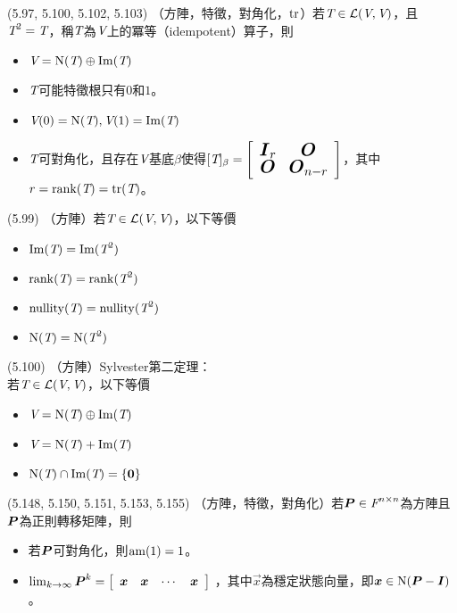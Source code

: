 \item \begin{theorem}{(5.97, 5.100, 5.102, 5.103)} （方陣，特徵，對角化，$\tr$）若$\T \in \L(\V, \V)$，且$\T^2 = \T$，稱$\T$為$\V$上的冪等（idempotent）算子，則
	\begin{itemize}
		\item $\V = \Ker(\T) \oplus \im(\T)$
		\item $\T$可能特徵根只有$0$和$1$。
		\item $\V(0) = \Ker(\T), \V(1) = \im(\T)$
		\item $\T$可對角化，且存在$\V$基底$\beta$使得$[\T]_{\beta} = 
		{\left[ 
		\begin{array}{cc}
			\Large{\mat{I}_r} & \Large{\mat{O}} \\
			\Large{\mat{O}} & \Large{\mat{O}_{n - r}}
		\end{array} 
		\right]}$，其中$r = \rnk(\T) = \tr(\T)$。
	\end{itemize}
\end{theorem}

\item \begin{theorem}{(5.99)} （方陣）若$\T \in \L(\V, \V)$，以下等價
	\begin{itemize}
		\item $\im(\T) = \im(\T^2)$
		\item $\rnk(\T) = \rnk(\T^2)$
		\item $\nul(\T) = \nul(\T^2)$
		\item $\Ker(\T) = \Ker(\T^2)$
	\end{itemize}
\end{theorem}

\item \begin{theorem}{(5.100)} （方陣）Sylvester第二定理： \\
	若$\T \in \L(\V, \V)$，以下等價
	\begin{itemize}
		\item $\V = \Ker(\T) \oplus \im(\T)$
		\item $\V = \Ker(\T) + \im(\T)$
		\item $\Ker(\T) \cap \im(\T) = \{\vec{0}\}$
	\end{itemize}
\end{theorem}

\item \begin{theorem}{(5.148, 5.150, 5.151, 5.153, 5.155)} （方陣，特徵，對角化）若$\mat{P} \in \F^{n \times n}$為方陣且$\mat{P}$為正則轉移矩陣，則
	\begin{itemize}
		\item 若$\mat{P}$可對角化，則$\am(1) = 1$。
		\item $\lim_{k \rightarrow \infty} \mat{P}^k = 
		{\left[ 
		\begin{array}{cccc}
			\vec{x} & \vec{x} & \cdots & \vec{x}
		\end{array} 
		\right]}$
		，其中$\vec{x}$為穩定狀態向量，即$\vec{x} \in \Ker(\mat{P} - \mat{I})$。
	\end{itemize}
\end{theorem}
